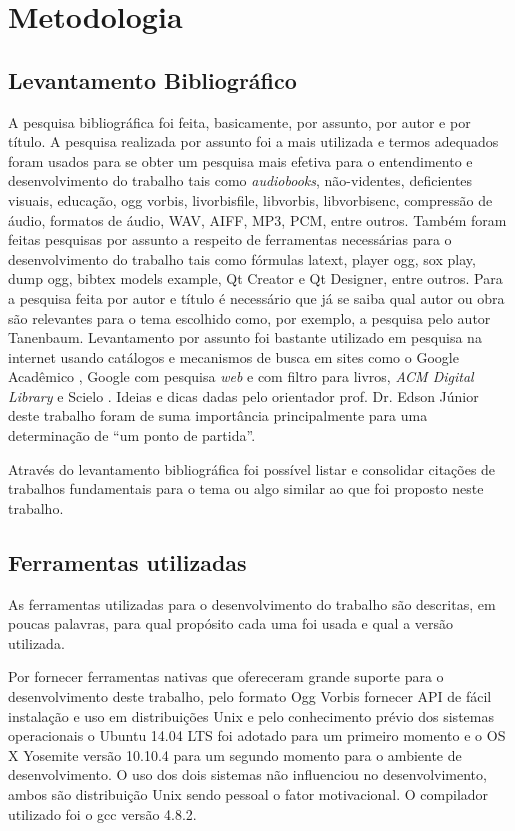 \chapter[Metodologia]{Metodologia}\label{cap3}

\section{Levantamento Bibliográfico}

A pesquisa bibliográfica foi feita, basicamente, por assunto, por autor e por título. A pesquisa realizada por assunto foi a mais utilizada e termos adequados foram usados para se obter um pesquisa mais efetiva para o entendimento e desenvolvimento do trabalho tais como \textit{audiobooks}, não-videntes, deficientes visuais, educação, ogg vorbis, livorbisfile, libvorbis, libvorbisenc, compressão de áudio, formatos de áudio, WAV, AIFF, MP3, PCM, entre outros. Também foram feitas pesquisas por assunto a respeito de ferramentas necessárias para o desenvolvimento do trabalho tais como fórmulas latext, player ogg, sox play, dump ogg, bibtex models example, Qt Creator e Qt Designer, entre outros. Para a pesquisa feita por autor e título é necessário que já se saiba qual autor ou obra são relevantes para o tema escolhido como, por exemplo, a pesquisa pelo autor Tanenbaum. Levantamento por assunto foi bastante utilizado em pesquisa na internet usando catálogos e mecanismos de busca em sites como o Google Acadêmico \cite{googleacademico}, Google com pesquisa \textit{web} e com filtro para livros, \textit{ACM Digital Library} \cite{acm} e Scielo \cite{scielo}. Ideias e dicas dadas pelo orientador prof. Dr. Edson Júnior deste trabalho foram de suma importância principalmente para uma determinação de ``um ponto de partida''.

Através do levantamento bibliográfica foi possível listar e consolidar citações de trabalhos fundamentais para o tema ou algo similar ao que foi proposto neste trabalho.

\section{Ferramentas utilizadas}

As ferramentas utilizadas para o desenvolvimento do trabalho são descritas, em poucas palavras, para qual propósito cada uma foi usada e qual a versão utilizada.

Por fornecer ferramentas nativas que ofereceram grande suporte para o desenvolvimento deste trabalho, pelo formato Ogg Vorbis fornecer API de fácil instalação e uso em distribuições Unix e pelo conhecimento prévio dos sistemas operacionais o Ubuntu 14.04 LTS foi adotado para um primeiro momento e o OS X Yosemite versão 10.10.4 para um segundo momento para o ambiente de desenvolvimento. O uso dos dois sistemas não influenciou no desenvolvimento, ambos são distribuição Unix sendo pessoal o fator motivacional. O compilador utilizado foi o gcc versão 4.8.2.

